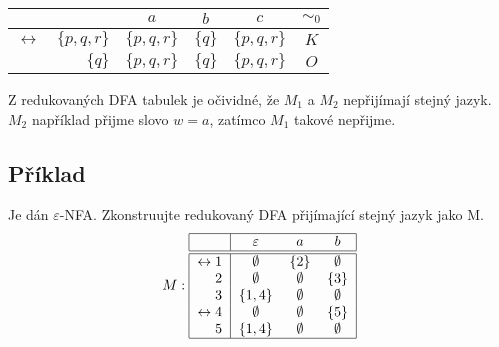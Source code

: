 \begin{multicols}{2}
    \begin{center}
        \begin{tabular}{|r r|c c c|c|}
            \hline
            & $ $ & $ a $ & $ b $ & $ c $ & $\sim_0$\\ \hline \hline
            $ \leftrightarrow $ & $\{p, q, r\}$ & $\{p, q, r\}$ & $\{q\}$ & $\{p, q, r\}$ &$K$ \\
            & $\{q\}$ & $\{p, q, r\}$ & $\{q\}$ & $\{p, q, r\}$ &$O$\\
            \hline
        \end{tabular}
    \end{center}

    Z redukovaných DFA tabulek je očividné, že $M_1$ a $M_2$ nepřijímají stejný jazyk. $M_2$ například přijme slovo $w=a$,
    zatímco $M_1$ takové nepřijme.

\columnbreak

\end{multicols}


\subsection{Příklad}
Je dán $\varepsilon$-NFA. Zkonstruujte redukovaný DFA přijímající stejný jazyk jako M.
\[
M:
\begin{tabular}{|r|c c c|}
    \hline
    & $\varepsilon$ & $a$ & $b$\\
    \hline
    \hline
    $\leftrightarrow 1$& $\emptyset$ & $\{2\}$& $\emptyset$\\
    $2$                & $\emptyset$ & $\emptyset$& $\{3\}$\\
    $3$                & $\{1,4\}$ & $\emptyset$& $\emptyset$\\
    $\leftrightarrow 4$& $\emptyset$ & $\emptyset$& $\{5\}$\\
    $5$                & $\{1,4\}$ & $\emptyset$& $\emptyset$\\
    \hline
\end{tabular}
\]

